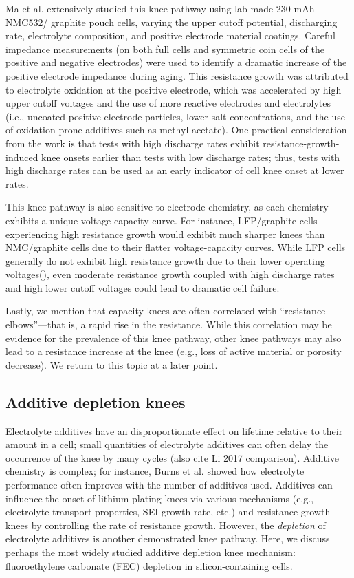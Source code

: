 \documentclass[journal=jpclcd,manuscript=article]{achemso}
\begin{document}
Ma et al.\cite{ma_editors_2019} extensively studied this knee pathway using lab-made 230 mAh NMC532/ graphite pouch cells, varying the upper cutoff potential, discharging rate, electrolyte composition, and positive electrode material coatings. Careful impedance measurements (on both full cells and symmetric coin cells of the positive and negative electrodes) were used to identify a dramatic increase of the positive electrode impedance during aging. This resistance growth was attributed to electrolyte oxidation at the positive electrode, which was accelerated by high upper cutoff voltages and the use of more reactive electrodes and electrolytes (i.e., uncoated positive electrode particles, lower salt concentrations, and the use of oxidation-prone additives such as methyl acetate). One practical consideration from the work is that tests with high discharge rates exhibit resistance-growth-induced knee onsets earlier than tests with low discharge rates; thus, tests with high discharge rates can be used as an early indicator of cell knee onset at lower rates.

This knee pathway is also sensitive to electrode chemistry, as each chemistry exhibits a unique voltage-capacity curve. For instance, LFP/graphite cells experiencing high resistance growth would exhibit much sharper knees than NMC/graphite cells due to their flatter voltage-capacity curves. While LFP cells generally do not exhibit high resistance growth due to their lower operating voltages(), even moderate resistance growth coupled with high discharge rates and high lower cutoff voltages could lead to dramatic cell failure.

Lastly, we mention that capacity knees are often correlated with ``resistance elbows''---that is, a rapid rise in the resistance. While this correlation may be evidence for the prevalence of this knee pathway, other knee pathways may also lead to a resistance increase at the knee (e.g., loss of active material or porosity decrease). We return to this topic at a later point.

\subsection{Additive depletion knees}

Electrolyte additives have an disproportionate effect on lifetime relative to their amount in a cell; small quantities of electrolyte additives can often delay the occurrence of the knee by many cycles\cite{ma_editors_2019} (also cite Li 2017 comparison). Additive chemistry is complex; for instance, Burns et al.\cite{burns_predicting_2013} showed how electrolyte performance often improves with the number of additives used. Additives can influence the onset of lithium plating knees via various mechanisms (e.g., electrolyte transport properties, SEI growth rate, etc.) and resistance growth knees by controlling the rate of resistance growth\cite{ma_editors_2019}. However, the \textit{depletion} of electrolyte additives is another demonstrated knee pathway. Here, we discuss perhaps the most widely studied additive depletion knee mechanism: fluoroethylene carbonate (FEC) depletion in silicon-containing cells.
\end{document}
